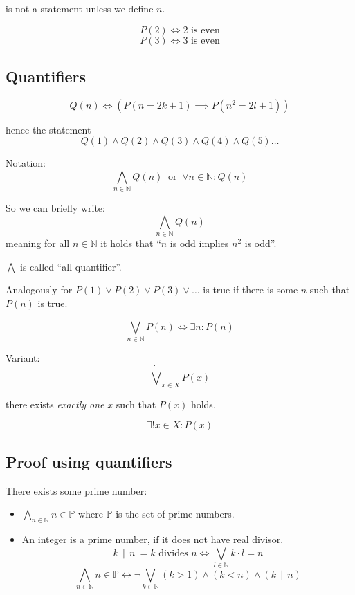 \documentclass[a4paper,landscape,twocolumn]{article}
\newcommand\divides[2]{#1\,\mid\,#2}
\begin{document}
is not a statement unless we define $n$.

\[ P(2) \Leftrightarrow \text{2 is even} \]
\[ P(3) \Leftrightarrow \text{3 is even} \]

\subsection{Quantifiers}

\[ Q(n) \Leftrightarrow \left(P(n = 2k + 1) \implies P(n^2 = 2l + 1)\right) \]

hence the statement
\[ Q(1) \land Q(2) \land Q(3) \land Q(4) \land Q(5) \ldots \]

Notation:
\[ \bigwedge_{n \in \mathbb{N}} Q(n) \:\text{ or }\: \forall n \in \mathbb{N}: Q(n) \]

So we can briefly write:
\[ \bigwedge_{n \in \mathbb{N}} Q(n) \]
meaning for all $n \in \mathbb{N}$ it holds that \enquote{$n$ is odd implies $n^2$ is odd}.

$\bigwedge$ is called \enquote{all quantifier}.

Analogously for $P(1) \lor P(2) \lor P(3) \lor \ldots$ is true if there is some $n$ such that $P(n)$ is true.

\[ \bigvee_{n \in \mathbb{N}} P(n) \Leftrightarrow \exists n: P(n) \]

Variant:
\[ \dot\bigvee_{x \in X} P(x) \]

there exists \emph{exactly one} $x$ such that $P(x)$ holds.

\[ \exists! x \in X: P(x) \]

\subsection{Proof using quantifiers}

There exists some prime number:

\begin{itemize}
  \item $\bigwedge_{n \in \mathbb{N}} n \in \mathbb{P}$
        where $\mathbb{P}$ is the set of prime numbers.
  \item An integer is a prime number, if it does not have real divisor.
        \[
            \divides{k}{n} \: = \text{$k$ divides $n$}
            \Leftrightarrow \bigvee_{l \in \mathbb{N}} k\cdot l = n
        \] \[
            \bigwedge_{n \in \mathbb{N}} n \in \mathbb{P}
              \leftrightarrow \neg \bigvee_{k \in \mathbb{N}} (k > 1) \land (k < n) \land (\divides{k}{n})
        \]
\end{itemize}
\end{document}
